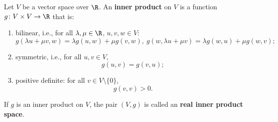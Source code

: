 \begin{definition}
  Let $V$ be a vector space over $\R$.
  An \textbf{inner product} on $V$ is a function
  $g \colon V \times V \to \R$ that is:
  \begin{enumerate}
    \item
      bilinear, i.e., for all $\lambda, \mu \in \R$, $u, v, w \in V$:
      \begin{equation}
        g(\lambda u + \mu v, w) = \lambda g(u, w) + \mu g(v, w),\
        g(w, \lambda u + \mu v) = \lambda g(w, u) + \mu g(w, v);
      \end{equation}
    \item
      symmetric, i.e., for all $u, v \in V$,
      \begin{equation}
        g(u, v) = g(v, u);
      \end{equation}
    \item
      positive definite: for all $v \in V \setminus \{0\}$,
      \begin{equation}
        g(v, v) > 0.
      \end{equation}
  \end{enumerate}
  If $g$ is an inner product on $V$, the pair $(V, g)$ is called an
  \textbf{real inner product space}.
\end{definition}
